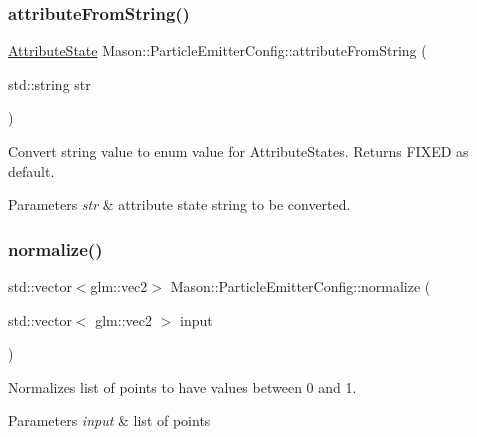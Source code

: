 \subsubsection{\texorpdfstring{attribute\+From\+String()}{attributeFromString()}}
{\footnotesize\ttfamily \hyperlink{namespace_mason_aefc2ce7d9295b57af46ab6c8ebfc32f7}{Attribute\+State} Mason\+::\+Particle\+Emitter\+Config\+::attribute\+From\+String (\begin{DoxyParamCaption}\item[{std\+::string}]{str }\end{DoxyParamCaption})\hspace{0.3cm}{\ttfamily [inline]}}



Convert string value to enum value for Attribute\+States. Returns F\+I\+X\+ED as default. 


\begin{DoxyParams}{Parameters}
{\em str} & attribute state string to be converted. \\
\hline
\end{DoxyParams}
\hypertarget{struct_mason_1_1_particle_emitter_config_ae3781dff36d32c1fb79a8ff63baf2c55}{}\label{struct_mason_1_1_particle_emitter_config_ae3781dff36d32c1fb79a8ff63baf2c55} 
\subsubsection{\texorpdfstring{normalize()}{normalize()}}
{\footnotesize\ttfamily std\+::vector$<$glm\+::vec2$>$ Mason\+::\+Particle\+Emitter\+Config\+::normalize (\begin{DoxyParamCaption}\item[{std\+::vector$<$ glm\+::vec2 $>$}]{input }\end{DoxyParamCaption})\hspace{0.3cm}{\ttfamily [inline]}}



Normalizes list of points to have values between 0 and 1. 


\begin{DoxyParams}{Parameters}
{\em input} & list of points \\
\hline
\end{DoxyParams}
\hypertarget{struct_mason_1_1_particle_emitter_config_ae4aa09d5feb556808fba6c23167d9d78}{}\label{struct_mason_1_1_particle_emitter_config_ae4aa09d5feb556808fba6c23167d9d78} 
